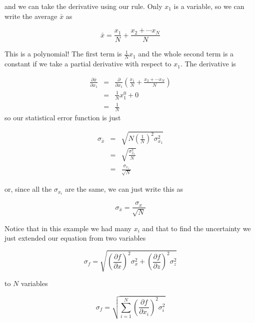 and we can take the derivative using our rule. Only $x_{1}$ is a variable, so we can write the average $\bar{x}$ as 

\begin{equation*}
	\bar{x}=\frac{x_{1}}{N}+\frac{x_{2}+\cdots x_{N}}{N}
\end{equation*}

This is a polynomial! The first term is $\frac{1}{N}x_{1}$ and the whole second term is a constant if we take a partial derivative with respect to $x_{1}$. The derivative is 

\begin{eqnarray*}
	\frac{\partial \bar{x}}{\partial x_{1}} &=&\frac{\partial }{\partial x_{1}}\left( \frac{x_{1}}{N}+\frac{x_{2}+\cdots x_{N}}{N}\right) \\
                                            &=&\frac{1}{N}x_{1}^{0}+0 \\
                                            &=&\frac{1}{N}
\end{eqnarray*}
so our statistical error function is just 

\begin{eqnarray*}
	\sigma _{\bar{x}} &=&\sqrt{N\left( \frac{1}{N}\right) ^{2}\sigma _{x_{1}}^{2}} \\
                      &=&\sqrt{\frac{\sigma _{x_{1}}^{2}}{N}} \\
                      &=&\frac{\sigma _{x_{1}}}{\sqrt{N}}
\end{eqnarray*}

or, since all the $\sigma _{x_{i}}$ are the same, we can just write this as 

\begin{equation*}
	\sigma _{\bar{x}}=\frac{\sigma _{x}}{\sqrt{N}}
\end{equation*}

Notice that in this example we had many $x_{i}$ and that to find the uncertainty we just extended our equation from two variables

\begin{equation*}
	\sigma _{f}=\sqrt{\left( \frac{\partial f}{\partial x}\right) ^{2}\sigma_{x}^{2}+\left( \frac{\partial f}{\partial z}\right) ^{2}\sigma _{z}^{2}}
\end{equation*}

to $N$ variables

\begin{equation*}
	\sigma _{f}=\sqrt{\sum_{i=1}^{N}\left( \frac{\partial f}{\partial x_{i}}\right) ^{2}\sigma _{i}^{2}}
\end{equation*}

